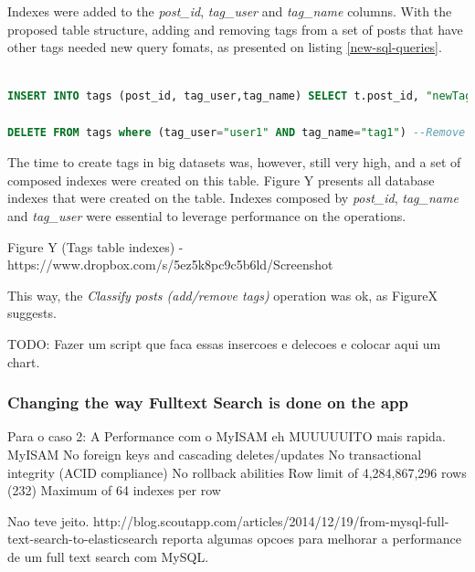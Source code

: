 Indexes were added to the \textit{post\_id}, \textit{tag\_user} and \textit{tag\_name} columns. With the proposed table structure, adding and removing tags from a set of posts that have other tags needed new query fomats, as presented on listing \ref{new-sql-queries}.

\begin{lstlisting}[language=SQL,firstnumber=1, caption=New SQL queries to add and remove tags, label=new-sql-queries]

INSERT INTO tags (post_id, tag_user,tag_name) SELECT t.post_id, "newTagUser", "newTagName" from tags t where (t.tag_user= "user1" and t.tag_name="tag1") OR (t.tag_user="user2" and t.tag_name="tag2") -- Create tags 

DELETE FROM tags where (tag_user="user1" AND tag_name="tag1") --Remove Tags

\end{lstlisting} 

The time to create tags in big datasets was, however, still very high, and a set of composed indexes were created on this table. Figure Y presents all database indexes that were created on the table. Indexes composed by \textit{post\_id}, \textit{tag\_name} and \textit{tag\_user} were essential to leverage performance on the operations. 

Figure Y (Tags table indexes) - https://www.dropbox.com/s/5ez5k8pc9c5b6ld/Screenshot%

This way, the \textit{Classify posts (add/remove tags)} operation was ok, as FigureX suggests. 

TODO: Fazer um script que faca essas insercoes e delecoes e colocar aqui um chart. 


	

\subsubsection{Changing the way Fulltext Search is done on the app}

Para o caso 2: A Performance com o MyISAM eh MUUUUUITO mais rapida.
MyISAM
	No foreign keys and cascading deletes/updates
	No transactional integrity (ACID compliance)
	No rollback abilities
	Row limit of 4,284,867,296 rows (232)
	Maximum of 64 indexes per row


	Nao teve jeito. 
	http://blog.scoutapp.com/articles/2014/12/19/from-mysql-full-text-search-to-elasticsearch reporta algumas opcoes para melhorar a performance de um full text search com MySQL. 

